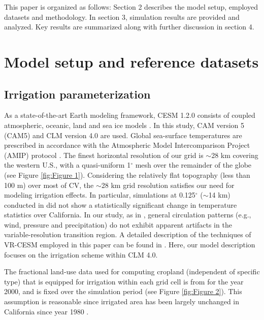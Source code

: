 \documentclass[draft,ms]{agutex}   %
\begin{document}
\begin{article}
This paper is organized as follows: Section 2 describes the model setup, employed datasets and methodology. In section 3, simulation results are provided and analyzed. Key results are summarized along with further discussion in section 4.

\section{Model setup and reference datasets}

\subsection{Irrigation parameterization}

As a state-of-the-art Earth modeling framework, CESM 1.2.0 consists of coupled atmospheric, oceanic, land and sea ice models \citep{CAM5Tech, hurrell2013community}. In this study, CAM version 5 (CAM5) \citep{CAM5Tech} and CLM version 4.0 \citep{CLM40Tech} are used.  Global sea-surface temperatures are prescribed in accordance with the Atmospheric Model Intercomparison Project (AMIP) protocol \citep{Gates1992}.  The finest horizontal resolution of our grid is $\sim$28 km covering the western U.S., with a quasi-uniform 1$^\circ$ mesh over the remainder of the globe (see Figure \ref{fig:Figure 1}). Considering the relatively flat topography (less than 100 m) over most of CV, the $\sim$28 km grid resolution satisfies our need for modeling irrigation effects. In particular, simulations at 0.125$^\circ$ ($\sim$14 km) conducted in \cite{huang2016evaluation} did not show a statistically significant change in temperature statistics over California.  In our study, as in \cite{zarzycki2015effects}, general circulation patterns (e.g., wind, pressure and precipitation) do not exhibit apparent artifacts in the variable-resolution transition region. A detailed description of the techniques of VR-CESM employed in this paper can be found in \cite{rhoades2015characterizing}. Here, our model description focuses on the irrigation scheme within CLM 4.0.

The fractional land-use data used for computing cropland (independent of specific type) that is equipped for irrigation within each grid cell is from \citet{siebert2005development} for the year 2000, and is fixed over the simulation period (see Figure \ref{fig:Figure 2}). This assumption is reasonable since irrigated area has been largely unchanged in California since year 1980 \citep{bonfils2007empirical}. 


\end{article}
\end{document}
